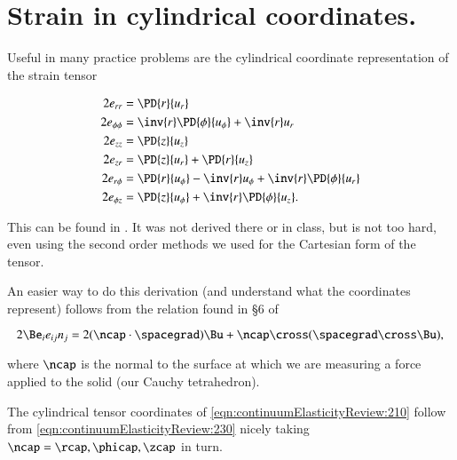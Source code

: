 \section{Strain in cylindrical coordinates.}

Useful in many practice problems are the cylindrical coordinate representation of the strain tensor 

\begin{align}\label{eqn:continuumElasticityReview:210}
2 e_{rr} &= \PD{r}{u_r}  \\
2 e_{\phi\phi} &= \inv{r} \PD{\phi}{u_\phi} +\inv{r} u_r  \\
2 e_{zz} &= \PD{z}{u_z}  \\
2 e_{zr} &= \PD{z}{u_r} + \PD{r}{u_z} \\
2 e_{r\phi} &= \PD{r}{u_\phi} - \inv{r} u_\phi + \inv{r} \PD{\phi}{u_r} \\
2 e_{\phi z} &= \PD{z}{u_\phi} +\inv{r} \PD{\phi}{u_z}.
\end{align}

This can be found in \cite{landau1960theory}.  It was not derived there or in class, but is not too hard, even using the second order methods we used for the Cartesian form of the tensor.

An easier way to do this derivation (and understand what the coordinates represent) follows from the relation found in \S 6 of \cite{acheson1990elementary}

\begin{equation}\label{eqn:continuumElasticityReview:230}
2 \Be_i e_{ij} n_j = 2 (\ncap \cdot \spacegrad) \Bu + \ncap \cross (\spacegrad \cross \Bu),
\end{equation}

where $\ncap$ is the normal to the surface at which we are measuring a force applied to the solid (our Cauchy tetrahedron).

The cylindrical tensor coordinates of \ref{eqn:continuumElasticityReview:210} follow from 
\ref{eqn:continuumElasticityReview:230} nicely taking $\ncap = \rcap, \phicap, \zcap$ in turn.


